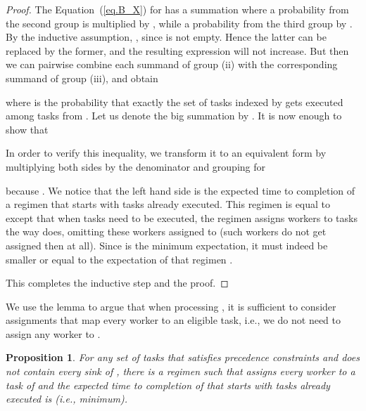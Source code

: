 \documentclass[letterpaper,11pt]{article}
\newtheorem{proposition}[theorem]{Proposition}
\begin{document}
\begin{proof}
The Equation~(\ref{eq.B_X}) for  has a summation where a probability from the second group is multiplied by , while a probability from the third group by . By the inductive assumption, , since  is not empty. Hence the latter can be replaced by the former, and the resulting expression will not increase. But then we can pairwise combine each summand of group (ii) with the corresponding summand of group (iii), and obtain 

where  is the probability that exactly the set of tasks indexed by  gets executed among tasks from . Let us denote the big summation by . It is now enough to show that 

In order to verify this inequality, we transform it to an equivalent form by multiplying both sides by the denominator and grouping for 

because .
We notice that the left hand side is the expected time to completion of a regimen  that starts with tasks  already executed. This regimen  is equal to  except that when tasks  need to be executed, the regimen assigns workers to tasks the way  does, omitting these workers assigned to  (such workers do not get assigned then at all). Since  is the minimum expectation, it must indeed be smaller or equal to the expectation of that regimen .

This completes the inductive step and the proof.
\end{proof}

We use the lemma to argue that when processing , it is sufficient to consider assignments  that map every worker to an eligible task, i.e., we do not need to assign any worker to .


\begin{proposition}
For any set  of tasks that satisfies precedence constraints and does not contain every sink of , there is a regimen  such that  assigns every worker to a task of  and the expected time to completion of  that starts with tasks  already executed is  (i.e., minimum).
\end{proposition}
\end{document}
